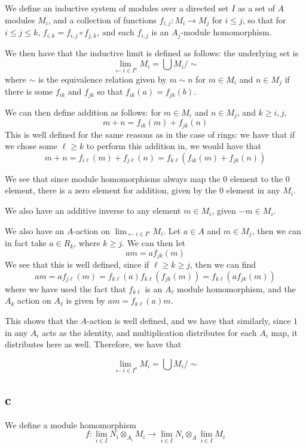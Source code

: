 \documentclass[a4paper]{article}
\theoremstyle{named}
\let\tempb\subsection
\renewcommand{\subsection}[1]{\tempb*{#1}}
\begin{document}
We define an inductive system of modules  over a directed set $I$ as a set of $A$ modules $M_{i}$, and a collection of functions $f_{i,j} : M_i \rightarrow M_j$ for $i \le j$, so that for $i \le j \le k$, $f_{i,k} = f_{i,j}\circ f_{j,k}$, and each $f_{i,j}$ is an $A_j$-module homomorphism.

We then have that the inductive limit is defined as follows: the underlying set is
\[
    \lim_{\leftarrow i \in I^{o}} M_i = \bigcup M_i / \sim
\]
where $\sim$ is the equivalence relation given by $m \sim n$ for $m \in M_i$ and $n \in M_j$ if there is some $f_{ik}$ and $f_{jk}$ so that $f_{ik}(a) = f_{jk}(b)$.

We can then define addition as follows: for $m \in M_i$ and $n \in M_j$, and $k \ge i,j$,
\[
    m + n = f_{ik}(m) + f_{jk}(n)
\]
This is well defined for the same reasons as in the case of rings: we have that if we chose some $\ell \ge k$ to perform this addition in, we would have that 
\[
    m + n = f_{i\ell}(m) + f_{j\ell}(n) = f_{k\ell}(f_{ik}(m) + f_{jk}(n))
\]

We see that since module homomorphisms always map the 0 element to the 0 element, there is a zero element for addition, given by the 0 element in any $M_i$.

We also have an additive inverse to any element $m \in M_i$, given $-m \in M_i$.

We also have an $A$-action on $\lim_{\leftarrow i \in I^{o}} M_i$. Let $a \in A$ and $m \in M_j$, then we can in fact take $a \in R_k$, where $k \ge j$. We can then let
\[
    a m = a f_{jk}(m)
\]
We see that this is well defined, since if $\ell \ge k \ge j$, then we can find 
\[
    a m = a f_{j\ell}(m) = f_{k\ell}(a)f_{k\ell}(f_{jk}(m)) =  f_{k\ell}(af_{jk}(m))
\]
where we have used the fact that $f_{k\ell}$ is an $A_{\ell}$ module homomorphism, and the $A_k$ action on $A_{\ell}$ is given by $a m = f_{k\ell}(a)m$.

This shows that the $A$-action is well defined, and we have that similarly, since $1$ in any $A_i$ acts as the identity, and multiplication distributes for each $A_i$ map, it distributes here as well. Therefore,  we have that

\[
    \lim_{\leftarrow i \in I^{o}} M_i = \bigcup M_i / \sim
\]
\subsection{c}
We define a module homomorphism
\[
    f : \lim_{i \in I} N_{i} \otimes_{A_i} M_i \rightarrow 
    \lim_{i \in I} N_{i} \otimes_A \lim_{i \in I} M_i
\]
\end{document}
